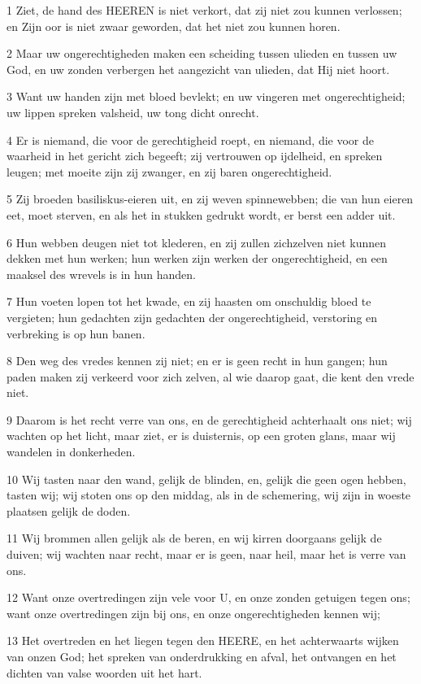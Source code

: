 \par 1 Ziet, de hand des HEEREN is niet verkort, dat zij niet zou kunnen verlossen; en Zijn oor is niet zwaar geworden, dat het niet zou kunnen horen.
\par 2 Maar uw ongerechtigheden maken een scheiding tussen ulieden en tussen uw God, en uw zonden verbergen het aangezicht van ulieden, dat Hij niet hoort.
\par 3 Want uw handen zijn met bloed bevlekt; en uw vingeren met ongerechtigheid; uw lippen spreken valsheid, uw tong dicht onrecht.
\par 4 Er is niemand, die voor de gerechtigheid roept, en niemand, die voor de waarheid in het gericht zich begeeft; zij vertrouwen op ijdelheid, en spreken leugen; met moeite zijn zij zwanger, en zij baren ongerechtigheid.
\par 5 Zij broeden basiliskus-eieren uit, en zij weven spinnewebben; die van hun eieren eet, moet sterven, en als het in stukken gedrukt wordt, er berst een adder uit.
\par 6 Hun webben deugen niet tot klederen, en zij zullen zichzelven niet kunnen dekken met hun werken; hun werken zijn werken der ongerechtigheid, en een maaksel des wrevels is in hun handen.
\par 7 Hun voeten lopen tot het kwade, en zij haasten om onschuldig bloed te vergieten; hun gedachten zijn gedachten der ongerechtigheid, verstoring en verbreking is op hun banen.
\par 8 Den weg des vredes kennen zij niet; en er is geen recht in hun gangen; hun paden maken zij verkeerd voor zich zelven, al wie daarop gaat, die kent den vrede niet.
\par 9 Daarom is het recht verre van ons, en de gerechtigheid achterhaalt ons niet; wij wachten op het licht, maar ziet, er is duisternis, op een groten glans, maar wij wandelen in donkerheden.
\par 10 Wij tasten naar den wand, gelijk de blinden, en, gelijk die geen ogen hebben, tasten wij; wij stoten ons op den middag, als in de schemering, wij zijn in woeste plaatsen gelijk de doden.
\par 11 Wij brommen allen gelijk als de beren, en wij kirren doorgaans gelijk de duiven; wij wachten naar recht, maar er is geen, naar heil, maar het is verre van ons.
\par 12 Want onze overtredingen zijn vele voor U, en onze zonden getuigen tegen ons; want onze overtredingen zijn bij ons, en onze ongerechtigheden kennen wij;
\par 13 Het overtreden en het liegen tegen den HEERE, en het achterwaarts wijken van onzen God; het spreken van onderdrukking en afval, het ontvangen en het dichten van valse woorden uit het hart.
